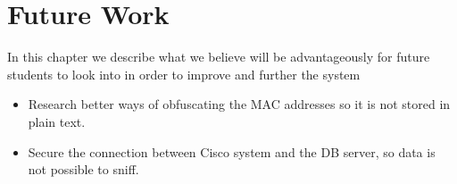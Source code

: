 \chapter{Future Work}
\label{Cha:Future_Work}
In this chapter we describe what we believe will be advantageously for future students to look into in order to improve and further the system 

\begin{itemize}
	\item Research better ways of obfuscating the MAC addresses so it is not stored in plain text.
	\item Secure the connection between Cisco system and the DB server, so data is not possible to sniff.
\end{itemize}


